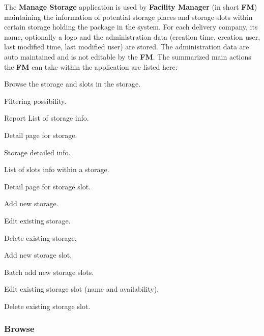The \textbf{Manage Storage} application is used by \textbf{Facility Manager} (in short \textbf{FM}) maintaining the information of potential storage places and storage slots within certain storage holding the package in the system. 
For each delivery company, its name, optionally a logo and the administration data (creation time, creation user, last modified time, last modified user) are stored. The administration data are auto maintained and is not editable by the \textbf{FM}. 
The summarized main actions the \textbf{FM} can take within the application are listed here:

\begin{compactenum}
	\item Browse the storage and slots in the storage.
        \begin{compactenum}
            \item Filtering possibility.
            \item Report List of storage info.
            \item Detail page for storage.
                \begin{compactenum}
                    \item Storage detailed info.
                    \item List of slots info within a storage.
                        \begin{compactenum}
                            \item Detail page for storage slot.
                        \end{compactenum}
                \end{compactenum}
        \end{compactenum}
    \item Add new storage.
    \item Edit existing storage.
    \item Delete existing storage.
    \item Add new storage slot.
    \item Batch add new storage slots.
    \item Edit existing storage slot (name and availability).
    \item Delete existing storage slot.
\end{compactenum}

\subsubsection{Browse}

